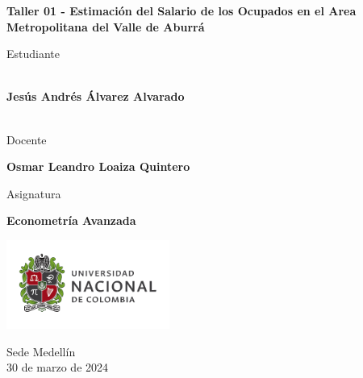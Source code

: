 \begin{titlepage}
   \Large{
   \begin{center}
       \vspace*{1cm}

       \textbf{Taller 01 - Estimación del Salario de los Ocupados en el Area Metropolitana del Valle de Aburrá}

            
       \vspace{1.5cm}
       
       Estudiante
       
       \vspace{0.5cm}
        
	\textbf{}\\    

	\textbf{Jesús Andrés Álvarez Alvarado}\\

	\textbf{}\\

              \vspace{1cm}
       
       Docente
       
       \vspace{0.5cm}

       \textbf{Osmar Leandro Loaiza Quintero}
       
       \vspace{0.4cm}

       \vspace{1.4cm}
       
       Asignatura
       
       \vspace{0.5cm}

       \textbf{Econometría Avanzada}

       \vfill

            
       \vspace{0.4cm}
     
       \includegraphics[width=0.4\textwidth]{logounal.png}
            
       Sede Medellín\\
       30 de marzo de 2024
       
   \end{center}
   }
\end{titlepage}